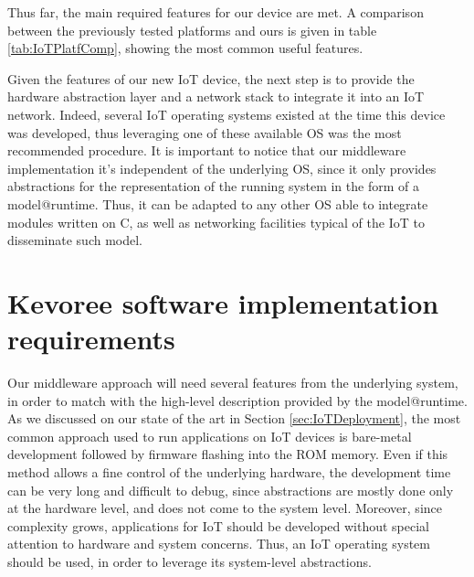Thus far, the main required features for our device are met.
A comparison between the previously tested platforms and ours is given in table \ref{tab:IoTPlatfComp}, showing the most common useful features.

Given the features of our new IoT device, the next step is to provide the hardware abstraction layer and a network stack to integrate it into an IoT network.
Indeed, several IoT operating systems existed at the time this device was developed, thus leveraging one of these available OS was the most recommended procedure.
It is important to notice that our middleware implementation it's independent of the underlying OS, since it only provides abstractions for the representation of the running system in the form of a model@runtime.
Thus, it can be adapted to any other OS able to integrate modules written on C, as well as networking facilities typical of the IoT to disseminate such model.

\section{Kevoree software implementation requirements}
\label{sec:kevoreeRequirements}
Our middleware approach will need several features from the underlying system, in order to match with the high-level description provided by the model@runtime.
As we discussed on our state of the art in Section \ref{sec:IoTDeployment}, the most common approach used to run applications on IoT devices is bare-metal development followed by firmware flashing into the ROM memory.
Even if this method allows a fine control of the underlying hardware, the development time can be very long and difficult to debug, since abstractions are mostly done only at the hardware level, and does not come to the system level.
Moreover, since complexity grows, applications for IoT should be developed without special attention to hardware and system concerns.
Thus, an IoT operating system should be used, in order to leverage its system-level abstractions.

